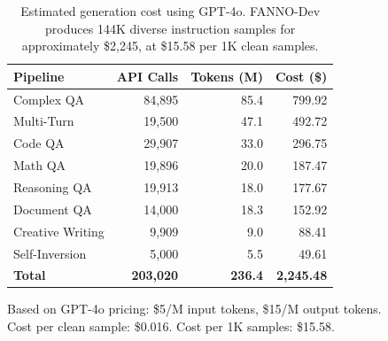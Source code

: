 \begin{table}[t]
\centering
\caption{Estimated generation cost using GPT-4o. FANNO-Dev produces 144K diverse instruction samples for approximately \$2,245, at \$15.58 per 1K clean samples.}
\label{tab:cost}
\small
\begin{tabular}{lrrr}
\toprule
\textbf{Pipeline} & \textbf{API Calls} & \textbf{Tokens (M)} & \textbf{Cost (\$)} \\
\midrule
Complex QA       & 84,895 & 85.4 & 799.92 \\
Multi-Turn       & 19,500 & 47.1 & 492.72 \\
Code QA          & 29,907 & 33.0 & 296.75 \\
Math QA          & 19,896 & 20.0 & 187.47 \\
Reasoning QA     & 19,913 & 18.0 & 177.67 \\
Document QA      & 14,000 & 18.3 & 152.92 \\
Creative Writing &  9,909 &  9.0 &  88.41 \\
Self-Inversion   &  5,000 &  5.5 &  49.61 \\
\midrule
\textbf{Total}   & \textbf{203,020} & \textbf{236.4} & \textbf{2,245.48} \\
\bottomrule
\end{tabular}
\vspace{-0.5em}
\begin{flushleft}
\scriptsize Based on GPT-4o pricing: \$5/M input tokens, \$15/M output tokens.\\
\scriptsize Cost per clean sample: \$0.016. Cost per 1K samples: \$15.58.
\end{flushleft}
\end{table}